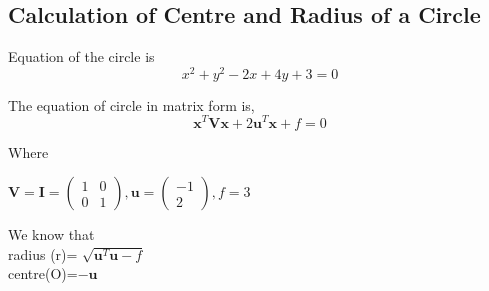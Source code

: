 \documentclass[journal,10pt,twocolumn]{article}
\let\vec\mathbf
\newcommand{\myvec}[1]{\ensuremath{\begin{pmatrix}#1\end{pmatrix}}}
\begin{document}
\subsection{Calculation of Centre and Radius of a Circle}
\begin{flushleft}
Equation of the circle is
\begin{equation}
x^2+y^2-2x+4y+3=0 
\end{equation}
\end{flushleft}
The equation of circle in matrix form is,
\begin{equation}
 \vec{x}^T \vec{V} \vec{x} + 2 \vec{u}^T \vec{x} + f = 0
\end{equation}
\begin{flushleft}
Where\\
\end{flushleft}
\begin{center}
\begin{math}
\vec{V} = \vec{I}= \myvec{ 1 & 0\\ 0 & 1} , \vec{u} = \myvec{-1 \\ 2}, f=3
\end{math}
\end{center}
\endcenter
\begin{flushleft}
We know that
\vspace{0.3cm}\\
radius (r)= \begin{math}
\sqrt{\vec{u}^T \vec{u} -f}\end{math}
\vspace{0.3cm}\\
centre(O)=$-\vec{u}$ 
\end{flushleft}
\end{document}
